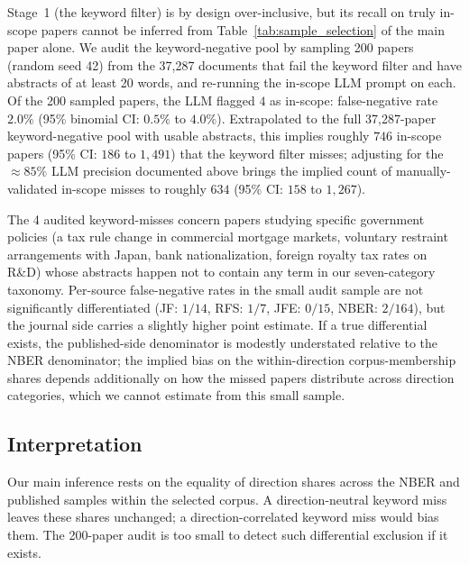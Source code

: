 \documentclass[12pt]{article}
\begin{document}
Stage~1 (the keyword filter) is by design over-inclusive, but its recall
on truly in-scope papers cannot be inferred from
Table~\ref{tab:sample_selection} of the main paper alone.  We audit the keyword-negative
pool by sampling 200 papers (random seed 42) from the 37,287 documents
that fail the keyword filter and have abstracts of at least 20 words, and
re-running the in-scope LLM prompt on each.  Of the 200 sampled papers,
the LLM flagged $4$ as in-scope: false-negative rate
$2.0\%$ (95\% binomial CI: $0.5\%$ to $4.0\%$).  Extrapolated to the full
37,287-paper keyword-negative pool with usable abstracts, this implies
roughly $746$ in-scope papers (95\% CI: $186$ to $1{,}491$) that the
keyword filter misses; adjusting for the $\approx 85\%$ LLM precision
documented above brings the implied count of manually-validated
in-scope misses to roughly $634$ (95\% CI: $158$ to $1{,}267$).

The 4 audited keyword-misses concern papers studying specific government
policies (a tax rule change in commercial mortgage markets, voluntary
restraint arrangements with Japan, bank nationalization, foreign royalty
tax rates on R\&D) whose abstracts happen not to contain any term in our
seven-category taxonomy.  Per-source false-negative rates in the small
audit sample are not significantly differentiated
(JF: $1/14$, RFS: $1/7$, JFE: $0/15$, NBER: $2/164$), but the journal
side carries a slightly higher point estimate.  If a true differential
exists, the published-side denominator is modestly understated relative
to the NBER denominator; the implied bias on the within-direction
corpus-membership shares depends additionally on how the missed papers
distribute across direction categories, which we cannot estimate from
this small sample.

\subsection*{Interpretation}

Our main inference rests on the equality of direction shares across the
NBER and published samples within the selected corpus.  A
direction-neutral keyword miss leaves these shares unchanged; a
direction-correlated keyword miss would bias them.  The 200-paper
audit is too small to detect such differential exclusion if it exists.

\end{document}
